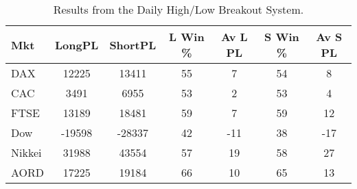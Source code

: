 \begin{table}[ht]
\centering
\caption[Results from the Daily High/Low Breakout System]{Results from the Daily High/Low Breakout System.} 
\label{tab:hl_bout_sys}
\begin{tabular}{lcccccc}
  \toprule Mkt & LongPL & ShortPL & L Win \% & Av L PL & S Win \% & Av S PL \\ 
  \midrule DAX & 12225 & 13411 & 55 & 7 & 54 & 8 \\ 
  CAC & 3491 & 6955 & 53 & 2 & 53 & 4 \\ 
  FTSE & 13189 & 18481 & 59 & 7 & 59 & 12 \\ 
  Dow & -19598 & -28337 & 42 & -11 & 38 & -17 \\ 
  Nikkei & 31988 & 43554 & 57 & 19 & 58 & 27 \\ 
  AORD & 17225 & 19184 & 66 & 10 & 65 & 13 \\ 
   \bottomrule \end{tabular}
\end{table}
